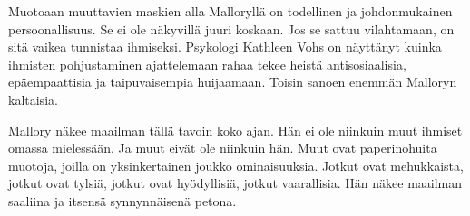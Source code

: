 Muotoaan muuttavien maskien alla Malloryllä on todellinen ja johdonmukainen persoonallisuus. Se ei ole näkyvillä juuri koskaan. Jos se sattuu vilahtamaan, on sitä vaikea tunnistaa ihmiseksi. Psykologi Kathleen Vohs on näyttänyt kuinka ihmisten pohjustaminen ajattelemaan rahaa tekee heistä antisosiaalisia, epäempaattisia ja taipuvaisempia huijaamaan. Toisin sanoen enemmän Malloryn kaltaisia.

Mallory näkee maailman tällä tavoin koko ajan. Hän ei ole niinkuin muut ihmiset omassa mielessään. Ja muut eivät ole niinkuin hän. Muut ovat paperinohuita muotoja, joilla on yksinkertainen joukko ominaisuuksia. Jotkut ovat mehukkaista, jotkut ovat tylsiä, jotkut ovat hyödyllisiä, jotkut vaarallisia. Hän näkee maailman saaliina ja itsensä synnynnäisenä petona.













